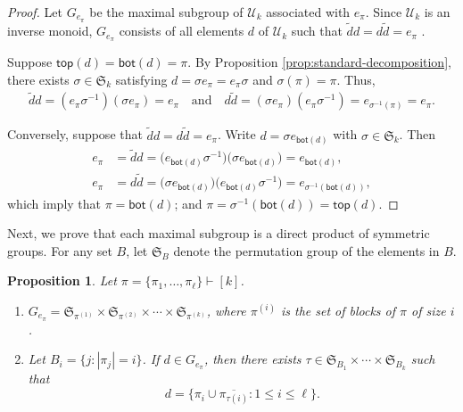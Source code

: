 \documentclass[10pt]{amsart}
\newtheorem{prop}[theorem]{Proposition}
\theoremstyle{definition}
\theoremstyle{remark}
\begin{document}
\begin{proof}
    Let $G_{e_\pi}$ be the maximal subgroup of $\mathcal{U}_k$ associated with $e_\pi$.
    Since $\mathcal{U}_k$ is an inverse monoid, $G_{e_\pi}$ consists of all
    elements $d$ of $\mathcal{U}_k$ such that $\widetilde{d}d = d\widetilde{d} = e_\pi$ \cite[Corollary 3.6]{Steinberg.2016}.

    Suppose $\mathsf{top}(d) = \mathsf{bot}(d) = \pi$.
    By Proposition \ref{prop:standard-decomposition},
    there exists $\sigma \in \mathfrak{S}_k$ satisfying $d = \sigma e_\pi = e_\pi \sigma$
    and $\sigma(\pi) = \pi$. Thus,
    \begin{align*}
        \widetilde{d} d = (e_\pi \sigma^{-1}) (\sigma e_\pi) = e_\pi
        \quad\text{and}\quad
        d \widetilde{d} = (\sigma e_\pi) (e_\pi \sigma^{-1}) = e_{\sigma^{-1}(\pi)} = e_{\pi}.
    \end{align*}

    Conversely, suppose that $\widetilde{d}d = d\widetilde{d} = e_\pi$.
    Write $d = \sigma e_{\mathsf{bot}(d)}$ with $\sigma \in \mathfrak{S}_k$.
    Then
    \begin{align*}
        e_\pi & = \widetilde{d}d = \big(e_{\mathsf{bot}(d)} \sigma^{-1}\big) \big(\sigma e_{\mathsf{bot}(d)}\big) = e_{\mathsf{bot}(d)},\\
        e_\pi &= d \widetilde{d} = \big(\sigma e_{\mathsf{bot}(d)}\big) \big(e_{\mathsf{bot}(d)} \sigma^{-1}\big) = e_{\sigma^{-1}(\mathsf{bot}(d))},
    \end{align*}
    which imply that $\pi = \mathsf{bot}(d)$; and $\pi = \sigma^{-1}(\mathsf{bot}(d)) = \mathsf{top}(d)$.
\end{proof}

Next, we prove that each maximal subgroup is a direct product of symmetric groups.
For any set $B$, let $\mathfrak{S}_B$ denote the permutation group of the elements in $B$.

\begin{prop}\label{prop:structGe}
    Let $\pi = \{\pi_1, \ldots, \pi_\ell\}\vdash [k]$.
    \begin{enumerate}
        \item
            $G_{e_\pi} = \mathfrak{S}_{\pi^{(1)}} \times \mathfrak{S}_{\pi^{(2)}}
            \times \cdots \times \mathfrak{S}_{\pi^{(k)}}$,
            where $\pi^{(i)}$ is the set of blocks of $\pi$ of size $i$.

        \item
            Let $B_i=\{j : |\pi_j| = i \}$. If $d \in G_{e_{\pi}}$, then there
            exists $\tau \in \mathfrak{S}_{B_1}\times \cdots \times
            \mathfrak{S}_{B_k}$ such that
            \begin{equation*}
                d = \big\{
                    \pi_i \cup \overline{\pi_{\tau(i)}} : 1 \leqslant i \leqslant \ell
                \big\}.
            \end{equation*}
    \end{enumerate}
\end{prop}
\end{document}
